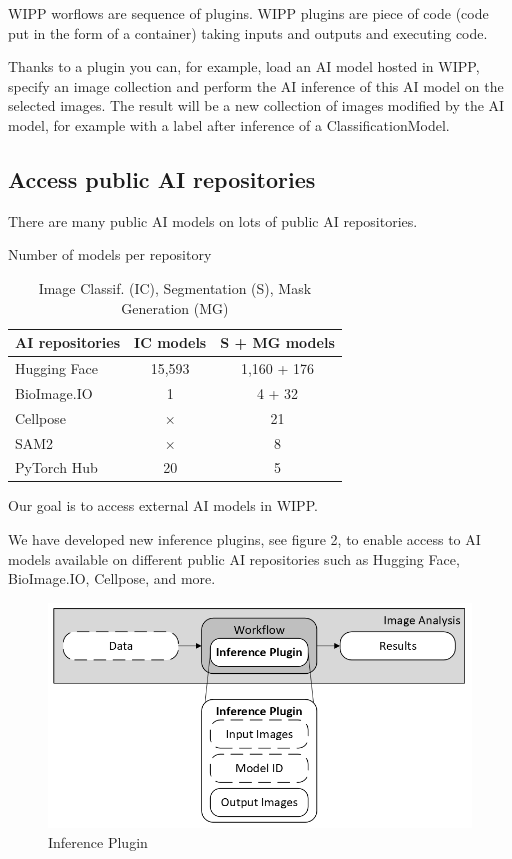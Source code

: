 WIPP worflows are sequence of plugins. WIPP plugins are piece of code (code put
in the form of a container) taking inputs and outputs and executing code.

Thanks to a plugin you can, for example, load an AI model hosted in
WIPP, specify an
image collection and perform the AI inference of this AI model on the
selected images.
The result will be a new collection of images modified by the AI model, for
example
with a label after inference of a \Gls{ClassificationModel}.

\subsection{Access public AI repositories}

There are many public AI models on lots of public AI repositories.

\begin{table}[H]
  \centering
  \caption{Number of models per repository}
  \begin{tabular}{lcc}
    \toprule
    AI repositories & IC models & S + MG models \\
    \midrule
    Hugging Face    & 15,593                      & 1,160 + 176 \\
    BioImage.IO     & 1                           & 4 + 32 \\
    Cellpose        & $\times$                    & 21 \\
    SAM2            & $\times$                    & 8 \\
    PyTorch Hub     & 20                          & 5 \\
    \bottomrule
  \end{tabular}
  \caption*{Image Classif. (IC), Segmentation (S), Mask Generation (MG)}
\end{table}

Our goal is to access external AI models in WIPP.

We have developed new inference plugins, see figure 2, to enable access to
AI models available on different public AI repositories such as
Hugging Face, BioImage.IO, Cellpose, and more.

\begin{figure}[H]
  \centering
  \includegraphics[width=1.0\linewidth]{png/methods/inference_plugin.png}
  \caption{Inference Plugin}
  \label{fig:2inference}
\end{figure}

